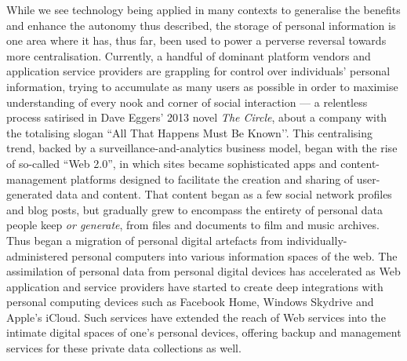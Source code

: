 \documentclass[graybox]{svmult}
\begin{document}
While we see technology being applied in many contexts to generalise the benefits and enhance the autonomy thus described, the storage of personal information is one area where it has, thus far, been used to power a perverse reversal towards more centralisation. Currently, a handful of dominant platform vendors and application service providers are grappling for control over individuals' personal information, trying to accumulate as many users as possible in order to maximise understanding of every nook and corner of social interaction --- a relentless process satirised in Dave Eggers’ 2013 novel {\em The Circle}, about a company with the totalising slogan ``All That Happens Must Be Known’’. This centralising trend, backed by a surveillance-and-analytics business model, began with the rise of so-called ``Web 2.0'', in which sites became sophisticated apps and content-management platforms designed to facilitate the creation and sharing of user-generated data and content. That content began as a few social network profiles and blog posts, but gradually grew to encompass the entirety of personal data people keep {\em or generate}, from files and documents to film and music archives. Thus began a migration of personal digital artefacts from individually-administered personal computers into various information spaces of the web.  The assimilation of personal data from personal digital devices has accelerated as Web application and service providers have started to create deep integrations with personal computing devices such as Facebook Home\cite{facebook}, Windows Skydrive\cite{skydrive} and Apple's iCloud\cite{icloud}. Such services have extended the reach of Web services into the intimate digital spaces of one's personal devices, offering backup and management services for these private data collections as well.
\end{document}
